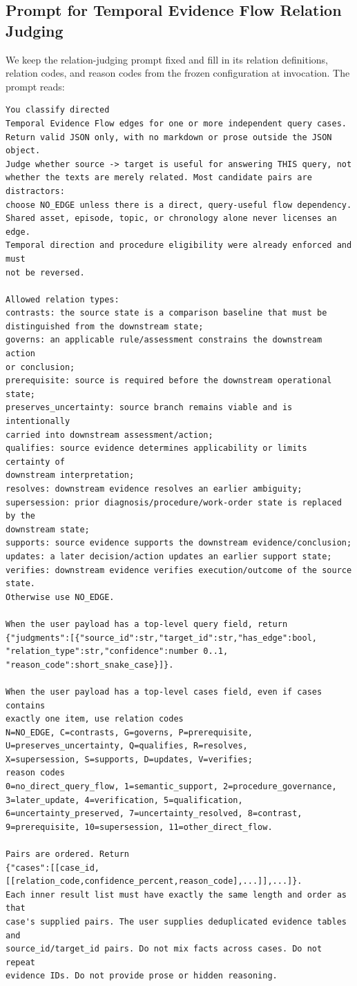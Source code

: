 \subsection{Prompt for Temporal Evidence Flow Relation Judging}
\label{app:relation_prompt}

We keep the relation-judging prompt fixed and fill in its relation definitions, relation codes, and reason codes from the frozen configuration at invocation. The prompt reads:

\begin{lstlisting}
You classify directed
Temporal Evidence Flow edges for one or more independent query cases.
Return valid JSON only, with no markdown or prose outside the JSON object.
Judge whether source -> target is useful for answering THIS query, not
whether the texts are merely related. Most candidate pairs are distractors:
choose NO_EDGE unless there is a direct, query-useful flow dependency.
Shared asset, episode, topic, or chronology alone never licenses an edge.
Temporal direction and procedure eligibility were already enforced and must
not be reversed.

Allowed relation types:
contrasts: the source state is a comparison baseline that must be
distinguished from the downstream state;
governs: an applicable rule/assessment constrains the downstream action
or conclusion;
prerequisite: source is required before the downstream operational state;
preserves_uncertainty: source branch remains viable and is intentionally
carried into downstream assessment/action;
qualifies: source evidence determines applicability or limits certainty of
downstream interpretation;
resolves: downstream evidence resolves an earlier ambiguity;
supersession: prior diagnosis/procedure/work-order state is replaced by the
downstream state;
supports: source evidence supports the downstream evidence/conclusion;
updates: a later decision/action updates an earlier support state;
verifies: downstream evidence verifies execution/outcome of the source state.
Otherwise use NO_EDGE.

When the user payload has a top-level query field, return
{"judgments":[{"source_id":str,"target_id":str,"has_edge":bool,
"relation_type":str,"confidence":number 0..1,
"reason_code":short_snake_case}]}.

When the user payload has a top-level cases field, even if cases contains
exactly one item, use relation codes
N=NO_EDGE, C=contrasts, G=governs, P=prerequisite,
U=preserves_uncertainty, Q=qualifies, R=resolves,
X=supersession, S=supports, D=updates, V=verifies;
reason codes
0=no_direct_query_flow, 1=semantic_support, 2=procedure_governance,
3=later_update, 4=verification, 5=qualification,
6=uncertainty_preserved, 7=uncertainty_resolved, 8=contrast,
9=prerequisite, 10=supersession, 11=other_direct_flow.

Pairs are ordered. Return
{"cases":[[case_id,[[relation_code,confidence_percent,reason_code],...]],...]}.
Each inner result list must have exactly the same length and order as that
case's supplied pairs. The user supplies deduplicated evidence tables and
source_id/target_id pairs. Do not mix facts across cases. Do not repeat
evidence IDs. Do not provide prose or hidden reasoning.
\end{lstlisting}

